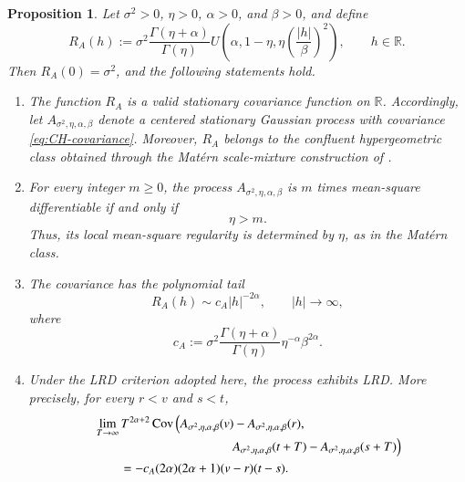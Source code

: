 \documentclass[preprint,12pt,authoryear]{elsarticle}
\newtheorem{prop}{Proposition}
\begin{document}
\begin{prop}
\label{prop:CH-local-LRD}
Let \(\sigma^2>0\), \(\eta>0\), \(\alpha>0\), and \(\beta>0\), and define
\begin{equation}\label{eq:CH-covariance}
R_A(h)
:=
\sigma^2
\frac{\Gamma(\eta+\alpha)}{\Gamma(\eta)}
U\!\left(
\alpha,1-\eta,
\eta\left(\frac{|h|}{\beta}\right)^2
\right),
\qquad h\in\mathbb R.
\end{equation}
Then \(R_A(0)=\sigma^2\), and the following statements hold.

\begin{enumerate}
\item[(i)]
The function \(R_A\) is a valid stationary covariance function on
\(\mathbb R\). Accordingly, let
\(A_{\sigma^2,\eta,\alpha,\beta}\) denote a centered stationary Gaussian
process with covariance \eqref{eq:CH-covariance}. Moreover, \(R_A\)
belongs to the confluent hypergeometric class obtained through the
Matérn scale-mixture construction of \citet{MaBhadra2023}.

\item[(ii)]
For every integer \(m\geq0\), the process
\(A_{\sigma^2,\eta,\alpha,\beta}\) is \(m\) times mean-square
differentiable if and only if
\[
\eta>m.
\]
Thus, its local mean-square regularity is determined by \(\eta\), as in
the Matérn class.

\item[(iii)]
The covariance has the polynomial tail
\begin{equation}\label{eq:CH-tail}
R_A(h)
\sim
c_A|h|^{-2\alpha},
\qquad |h|\to\infty,
\end{equation}
where
\[
c_A
:=
\sigma^2
\frac{\Gamma(\eta+\alpha)}{\Gamma(\eta)}
\eta^{-\alpha}\beta^{2\alpha}.
\]

\item[(iv)]
Under the LRD criterion adopted here, the process exhibits LRD. More
precisely, for every \(r<v\) and \(s<t\),
\begin{equation}\label{eq:CH-lrd-limit}
\begin{aligned}
&\lim_{T\to\infty}
T^{2\alpha+2}
\operatorname{Cov}
\left(
A_{\sigma^2,\eta,\alpha,\beta}(v)
-
A_{\sigma^2,\eta,\alpha,\beta}(r),
\right.
\\[-1mm]
&\hspace{3.7cm}\left.
A_{\sigma^2,\eta,\alpha,\beta}(t+T)
-
A_{\sigma^2,\eta,\alpha,\beta}(s+T)
\right)
\\
&\qquad
=
-c_A(2\alpha)(2\alpha+1)(v-r)(t-s).
\end{aligned}
\end{equation}
\end{enumerate}
\end{prop}
\end{document}
